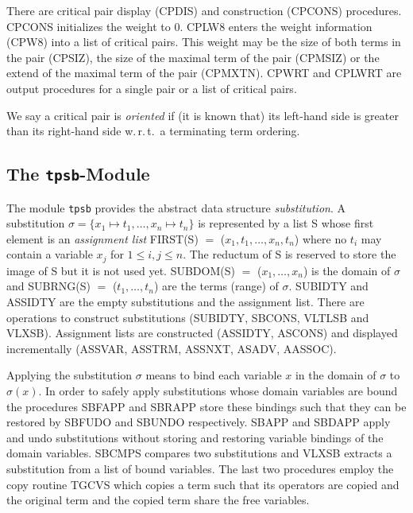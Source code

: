 There are critical pair display (CPDIS) and construction (CPCONS) procedures.
CPCONS initializes the weight to 0.
CPLW8 enters the weight information (CPW8) into a list of critical pairs.
This weight may be the size of both terms in the pair (CPSIZ), the size of
the maximal term of the pair (CPMSIZ) or the extend of the maximal term of
the pair (CPMXTN).
CPWRT and CPLWRT are output procedures for a single pair or a list of critical
pairs.

We say a critical pair is {\em oriented} if (it is known that) its
left-hand side is greater than its right-hand side w.\,r.\,t.\ a terminating
term ordering.


\subsection{The {\tt tpsb}-Module} \label{ss:sb}

The module {\tt tpsb} provides the abstract data structure {\em substitution}.
A substitution 
\( \sigma = \{ x_1 \mapsto t_1, \ldots, x_n \mapsto  t_n \} \)
is represented by a list S whose first element is an
{\em assignment list} FIRST(S) $=$ ($x_1, t_1, \ldots, x_n, t_n$) where no
$t_i$ may contain a variable $x_j$ for \( 1 \leq i, j \leq n \).
The reductum of S is reserved to store the image of S but it is not used yet.
SUBDOM(S) $=$ ($x_1, \ldots, x_n$) is the domain of $\sigma$ and
SUBRNG(S) $=$ ($t_1, \ldots, t_n$) are the terms (range) of $\sigma$.
SUBIDTY and ASSIDTY are the empty substitutions and the assignment list.
There are operations to construct substitutions (SUBIDTY, SBCONS, VLTLSB
and VLXSB).
Assignment lists are constructed (ASSIDTY, ASCONS) and displayed incrementally
(ASSVAR, ASSTRM, ASSNXT, ASADV, AASSOC).

Applying the substitution $\sigma$ means to bind each variable $x$ in the domain 
of $\sigma$ to $\sigma(x)$.
In order to safely apply substitutions whose domain variables are bound 
the procedures SBFAPP and SBRAPP store these bindings such that they can
be restored by SBFUDO and SBUNDO respectively.
SBAPP and SBDAPP apply and undo substitutions without storing and restoring 
variable bindings of the domain variables.
SBCMPS compares two substitutions and VLXSB extracts a substitution from a
list of bound variables.
The last two procedures employ the copy routine TGCVS
which copies a term such that its operators are copied and the original 
term and the copied term share the free variables.

